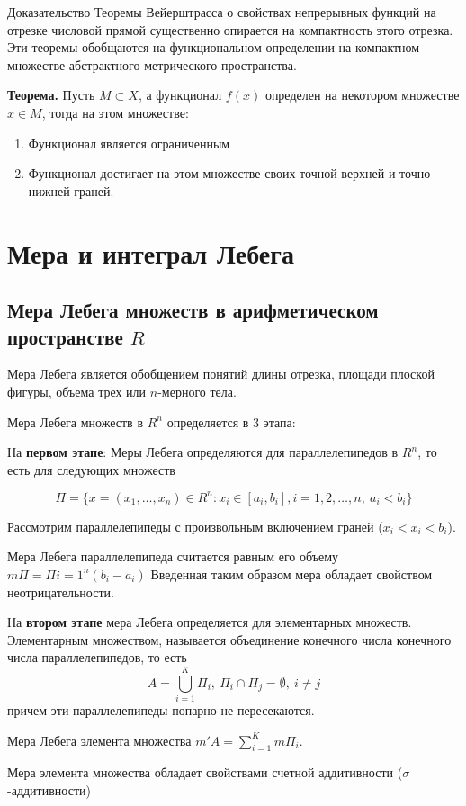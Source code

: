 \documentclass[14pt]{extarticle}
\theoremstyle{definition}
\theoremstyle{remark}
\newcommand{\be}{\begin{enumerate}}
\newcommand{\ee}{\end{enumerate}}
\renewcommand{\[}{\begin{dmath*}[compact]}
\renewcommand{\]}{\end{dmath*}}
\newcommand{\sep}{ , \ \allowbreak }
\newcommand{\tth}[1][]{\textbf{Теорема#1.}}
\begin{document}
Доказательство Теоремы Вейерштрасса о свойствах непрерывных функций на отрезке числовой прямой существенно опирается на компактность этого отрезка. Эти теоремы обобщаются на функциональном определении на компактном множестве абстрактного метрического пространства.

\tth[] Пусть $M\subset X$, а функционал $f(x)$ определен на некотором множестве $x \in M$, тогда на этом множестве:

\be
  \item Функционал является ограниченным
  \item Функционал достигает на этом множестве своих точной верхней и точно нижней граней.
\ee

\section{Мера и интеграл Лебега}

\subsection{Мера Лебега множеств в арифметическом пространстве $R$}

Мера Лебега является обобщением понятий длины отрезка, площади плоской фигуры, объема трех или $n$-мерного тела.

Мера Лебега множеств в $R^n$ определяется в 3 этапа:

На \textbf{первом этапе}: Меры Лебега определяются для параллелепипедов в $R^n$, то есть для следующих множеств

\[
  \Pi = \{x=(x_1,\dots,x_n)\in R^n: x_i\in [a_i,b_i], i=1,2,\dots,n\sep a_i<b_i\}
\]

Рассмотрим параллелепипеды с произвольным включением граней ($x_i<x_i<b_i$).

Мера Лебега параллелепипеда считается равным его объему $m\Pi = \Pi{i=1}^n(b_i-a_i)$ Введенная таким образом мера обладает свойством неотрицательности.

На \textbf{втором этапе} мера Лебега определяется для элементарных множеств. Элементарным множеством, называется объединение конечного числа конечного числа параллелепипедов, то есть
\[A=\bigcup _{i=1}^K \Pi_i\sep\Pi_i \cap \Pi_j = \emptyset \sep i\neq j\]
причем эти параллелепипеды попарно не пересекаются.

Мера Лебега элемента множества $m'A=\sum_{i=1}^Km\Pi_i$.

Мера элемента множества обладает свойствами счетной аддитивности ($\sigma$-аддитивности)
\end{document}
